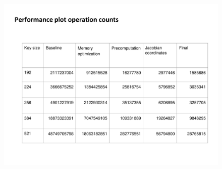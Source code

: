 \begin{frame}
\begin{figure}\flushleft		
\includegraphics[scale=0.4, trim={0 0 0 0}]{tablewithtitle}		
\end{figure}
\end{frame}